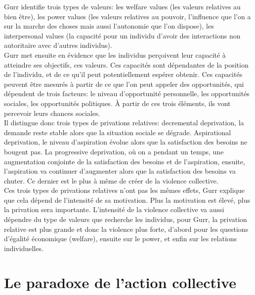 \documentclass[10pt, a4paper, openany]{book}
\begin{document}
Gurr identifie trois types de valeurs: les welfare values (les valeurs relatives au bien être), les power values (les valeurs relatives au pouvoir, l'influence que l'on a sur la marche des choses mais aussi l'autonomie que l'on dispose), les interpersonal values (la capacité pour un individu d'avoir des interactions non autoritaire avec d'autres individus). \\
Gurr met ensuite en évidence que les individus perçoivent leur capacité à atteindre ses objectifs, ces valeurs. Ces capacités sont dépendantes de la position de l'individu, et de ce qu'il peut potentiellement espérer obtenir. Ces capacités peuvent être mesurés à partir de ce que l'on peut appeler des opportunités, qui dépendent de trois facteurs: le niveau d'opportunité personnelle, les opportunités sociales, les opportunités politiques. À partir de ces trois éléments, ils vont percevoir leurs chances sociales. \\
Il distingue donc trois types de privations relatives: decremental deprivation, la demande reste stable alors que la situation sociale se dégrade. Aspirational deprivation, le niveau d'aspiration évolue alors que la satisfaction des besoins ne bougent pas. La progressive deprivation, où on a pendant un temps, une augmentation conjointe de la satisfaction des besoins et de l'aspiration, ensuite, l'aspiration va continuer d'augmenter alors que la satisfaction des besoins va chuter. Ce dernier est le plus à même de créer de la violence collective. \\
Ces trois types de privations relatives n'ont pas les mêmes effets, Gurr explique que cela dépend de l'intensité de sa motivation. Plus la motivation est élevé, plus la privation sera importante. L'intensité de la violence collective va aussi dépendre du type de valeurs que recherche les individus, pour Gurr, la privation relative est plus grande et donc la violence plus forte, d'abord pour les questions d'égalité économique (welfare), ensuite sur le power, et enfin sur les relations individuelles. 

\chapter{Le paradoxe de l'action collective}
\end{document}
